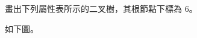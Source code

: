 \startEXERCISE
畫出下列屬性表所示的二叉樹，其根節點下標為 6。

\stopEXERCISE

\startANSWER
如下圖。

\externalfigure[output/e10_4_1-1]
\stopANSWER
